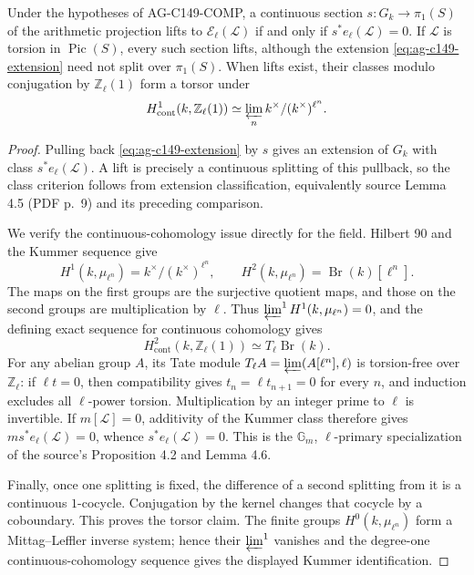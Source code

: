 \begin{proposition}
Under the hypotheses of AG-C149-COMP, a continuous section
$s:G_k\to\pi_1(S)$ of the arithmetic projection lifts to
$\mathcal E_\ell(\mathcal L)$ if and only if
$s^*e_\ell(\mathcal L)=0$. If $\mathcal L$ is torsion in
$\operatorname{Pic}(S)$, every such section lifts, although the
extension \eqref{eq:ag-c149-extension} need not split over
$\pi_1(S)$. When lifts exist, their classes modulo conjugation by
$\mathbb Z_\ell(1)$ form a torsor under
\[
 H^1_{\mathrm{cont}}(k,\mathbb Z_\ell(1))
   \simeq\varprojlim_n k^\times/(k^\times)^{\ell^n}.
\]
\end{proposition}
\begin{proof}
Pulling back \eqref{eq:ag-c149-extension} by $s$ gives an extension of
$G_k$ with class $s^*e_\ell(\mathcal L)$. A lift is precisely a
continuous splitting of this pullback, so the class criterion follows
from extension classification, equivalently source Lemma 4.5
(PDF p.~9) and its preceding comparison.

We verify the continuous-cohomology issue directly for the field.
Hilbert 90 and the Kummer sequence give
\[
 H^1(k,\mu_{\ell^n})=k^\times/(k^\times)^{\ell^n},\qquad
 H^2(k,\mu_{\ell^n})=\operatorname{Br}(k)[\ell^n].
\]
The maps on the first groups are the surjective quotient maps, and
those on the second groups are multiplication by $\ell$. Thus
$\varprojlim^1 H^1(k,\mu_{\ell^n})=0$, and the defining exact
sequence for continuous cohomology gives
\[
 H^2_{\mathrm{cont}}(k,\mathbb Z_\ell(1))
   \simeq T_\ell\operatorname{Br}(k).
\]
For any abelian group $A$, its Tate module
$T_\ell A=\varprojlim(A[\ell^n],\ell)$ is torsion-free over
$\mathbb Z_\ell$: if $\ell t=0$, then compatibility gives
$t_n=\ell t_{n+1}=0$ for every $n$, and induction excludes all
$\ell$-power torsion. Multiplication by an integer prime to $\ell$
is invertible. If $m[\mathcal L]=0$, additivity of the Kummer class
therefore gives
$m s^*e_\ell(\mathcal L)=0$, whence $s^*e_\ell(\mathcal L)=0$.
This is the $\mathbb G_m$, $\ell$-primary specialization of the
source's Proposition 4.2 and Lemma 4.6.

Finally, once one splitting is fixed, the difference of a second
splitting from it is a continuous $1$-cocycle. Conjugation by the
kernel changes that cocycle by a coboundary. This proves the torsor
claim. The finite groups $H^0(k,\mu_{\ell^n})$ form a
Mittag--Leffler inverse system; hence their $\varprojlim^1$ vanishes
and the degree-one continuous-cohomology sequence gives the displayed
Kummer identification.
\end{proof}

